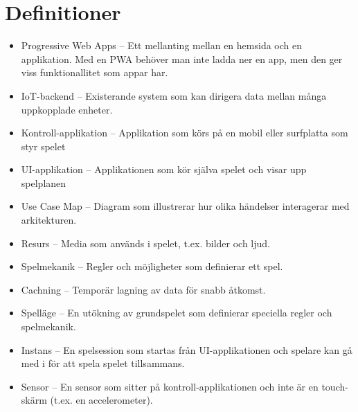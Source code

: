 \section{Definitioner}
\begin{itemize}
  \item Progressive Web Apps -- Ett mellanting mellan en hemsida och en applikation. Med en PWA behöver man inte ladda ner en app, men den ger viss funktionallitet som appar har. \cite{bib-pwa}
  \item IoT-backend -- Existerande system som kan dirigera data mellan många uppkopplade enheter.
  \item Kontroll-applikation -- Applikation som körs på en mobil eller surfplatta som styr spelet
  \item UI-applikation -- Applikationen som kör själva spelet och visar upp spelplanen
  \item Use Case Map -- Diagram som illustrerar hur olika händelser interagerar med arkitekturen. \cite[p.~30--33]{bib-architecture-primer}
  \item Resurs -- Media som används i spelet, t.ex. bilder och ljud.
  \item Spelmekanik -- Regler och möjligheter som definierar ett spel.
  \item Cachning -- Temporär lagning av data för snabb åtkomst.
  \item Spelläge -- En utökning av grundspelet som definierar speciella regler och spelmekanik.
  \item Instans -- En spelsession som startas från UI-applikationen och spelare kan gå med i för att spela spelet tillsammans.
  \item Sensor -- En sensor som sitter på kontroll-applikationen och inte är en touch-skärm (t.ex. en accelerometer).
\end{itemize}
